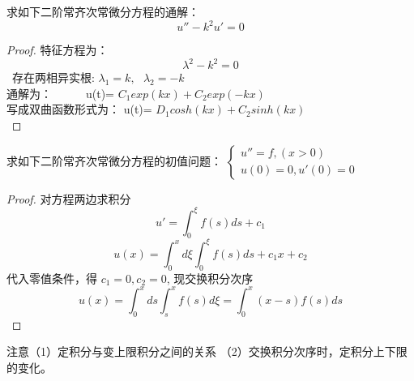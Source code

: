 \begin{example} %
	求如下二阶常齐次常微分方程的通解：
	\begin{equation*}
		u''-k^2u'=0
	\end{equation*}
	\begin{proof} 
		特征方程为：
		\begin{equation*}
			\lambda^2 -k^2=0
		\end{equation*}
		 存在两相异实根: $\lambda_1=k, ~~~ \lambda_2 =-k $ \\
		通解为：~~~~~~u(t)= $C_1 exp(k x)+ C_2 exp (-k x) $  \\
		写成双曲函数形式为： u(t)= $D_1 cosh(k x)+ C_2 sinh (k x) $  \\
	\end{proof}
\end{example}

\begin{example} %
	求如下二阶常齐次常微分方程的初值问题：
$\begin{cases}
	u'' =f, (x>0)\\
	u(0)=0, u'(0)=0
\end{cases}$
	\begin{proof} 
		对方程两边求积分
		\begin{equation*}
		u'=\int_{0}^{\xi} f(s) ds +c_1
		\end{equation*}
		\begin{equation*}
		u(x)=\int_{0}^{x}   d\xi  \int_{0}^{\xi} f(s) ds +c_1x  +c_2
	    \end{equation*}
       代入零值条件，得  $c_1=0, c_2=0$, 现交换积分次序\\
 		\begin{equation*}
     	u(x)=\int_{0}^{x}   ds  \int_{s}^{x} f(s) d\xi = \int_{0}^{x}  (x-s)f(s) ds 
         \end{equation*}      
	\end{proof}
\end{example}
\begin{note}
	注意（1）定积分与变上限积分之间的关系 （2）交换积分次序时，定积分上下限的变化。
\end{note}

